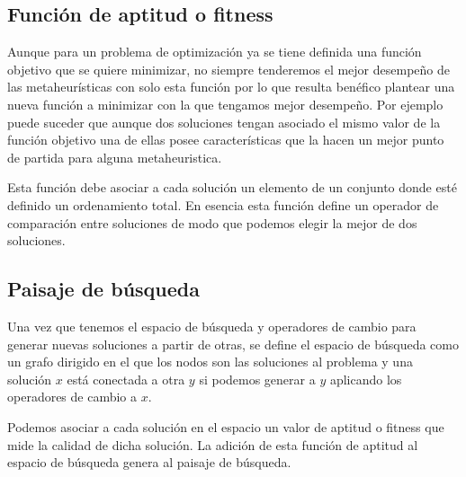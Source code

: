 \subsection{Función de aptitud o fitness}
Aunque para un problema de optimización ya se tiene definida una función objetivo que se quiere minimizar, no siempre tenderemos el mejor desempeño de las metaheurísticas con solo esta función por lo que resulta benéfico plantear una nueva función a minimizar con la que tengamos mejor desempeño. Por ejemplo puede suceder que aunque dos soluciones tengan asociado el mismo valor de la función objetivo una de ellas posee características que la hacen un mejor punto de partida para alguna metaheuristica.

Esta función debe asociar a cada solución un elemento de un conjunto donde esté definido un ordenamiento total. En esencia esta función define un operador de comparación entre soluciones de modo que podemos elegir la mejor de dos soluciones.\\

\subsection{Paisaje de búsqueda}

Una vez que tenemos el espacio de búsqueda y operadores de cambio para generar nuevas soluciones a partir de otras, se define el espacio de búsqueda como un grafo dirigido en el que los nodos son las soluciones al problema y una solución $x$ está conectada a otra $y$ si podemos generar a $y$ aplicando los operadores de cambio a $x$.

Podemos asociar a cada solución en el espacio un valor de aptitud o fitness que mide la calidad de dicha solución. La adición de esta función de aptitud al espacio de búsqueda genera al paisaje de búsqueda.

